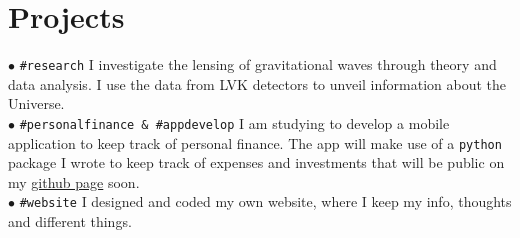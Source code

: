 \documentclass[letterpaper]{twentysecondcv} %
\begin{document}

\section{Projects}

\iffalse
\begin{twentymedium} %
    \twentyitemmedium{research}{PostDoc Researcher \dots .}{}{}
    \twentyitemmedium{website}{I created \dots .}{}{}
    \twentyitemmedium{app}{I am developing.}{}{}
    \twentyitemmedium{personal\\finance}{I created a package \dots .}{}{}
\end{twentymedium}
\fi

$\bullet$ \texttt{\#research}  
          {\small I investigate the lensing of gravitational waves through theory and data analysis. I use the data from LVK detectors to unveil information about the Universe.}\\
$\bullet$ \texttt{\#personalfinance \& \#appdevelop}
          {\small I am studying to develop a mobile application to keep track of personal finance.
          The app will make use of a \texttt{python} package I wrote to keep track of expenses and investments that will be public on my \href{https://github.com/PaoloCremo}{github page} soon.}\\
$\bullet$ \texttt{\#website}   
          {\small I designed and coded my own website, where I keep my info, thoughts and different things.}



% 

\end{document}
